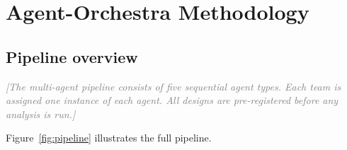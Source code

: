 \documentclass[12pt,a4paper]{article}
\newcommand{\placeholder}[1]{\textcolor{gray}{\textit{[#1]}}}
\begin{document}
\section{Agent-Orchestra Methodology}
\label{sec:method}

\subsection{Pipeline overview}

\placeholder{The multi-agent pipeline consists of five sequential agent
types. Each team is assigned one instance of each agent. All designs
are pre-registered before any analysis is run.}

Figure~\ref{fig:pipeline} illustrates the full pipeline.
\end{document}
